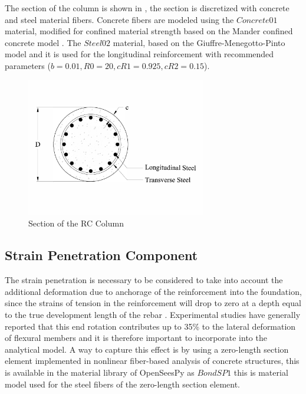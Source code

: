 The section of the column is shown in , the section is discretized with concrete and steel material fibers. Concrete fibers are modeled using the $Concrete01$ material, modified for confined material strength based on the Mander confined concrete model \cite{Mander1988}. The $Steel02$ material, based on the Giuffre-Menegotto-Pinto model \cite{Filippou1983} and it is used for the longitudinal reinforcement with recommended parameters ($b = 0.01, R0 = 20, cR1 = 0.925, cR2 = 0.15$). 

\begin{figure}[htbp]
	\centering
	\includegraphics[width=0.7\textwidth]{Chapter-5/figs/StructuralModel_Section}
	\caption{Section of the RC Column}
	\label{fig:ColumnSection}
\end{figure}

\subsection{Strain Penetration Component}

The strain penetration is necessary to be considered to take into account the additional deformation due to anchorage of the reinforcement into the foundation, since the strains of tension in the reinforcement will drop to zero at a depth equal to the true development length of the rebar \cite{Priestley2007}. Experimental studies have generally reported that this end rotation contributes up to 35\% to the lateral deformation of flexural members\cite{Zhao2007} and it is therefore important to incorporate into the analytical model. A way to capture this effect is by using a zero-length section element implemented in nonlinear fiber-based analysis of concrete structures, this is available in the material library of OpenSeesPy as $Bond SP1$ \cite{Zhao2007} this is material model used for the steel fibers of the zero-length section element. 


